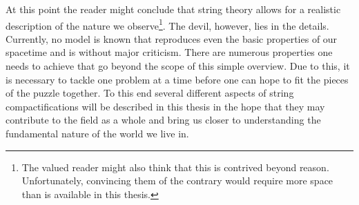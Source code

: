 \documentclass[a4paper,12pt,twoside,openright]{report}
\begin{document}
At this point the reader might conclude that string theory allows for a realistic description of the nature we observe\footnote{The valued reader might also think that this is contrived beyond reason. Unfortunately, convincing them of the contrary would require more space than is available in this thesis.}. The devil, however, lies in the details. Currently, no model is known that reproduces even the basic properties of our spacetime and is without major criticism. There are numerous properties one needs to achieve that go beyond the scope of this simple overview. Due to this, it is necessary to tackle one problem at a time before one can hope to fit the pieces of the puzzle together. To this end several different aspects of string compactifications will be described in this thesis in the hope that they may contribute to the field as a whole and bring us closer to understanding the fundamental nature of the world we live in.
\end{document}
